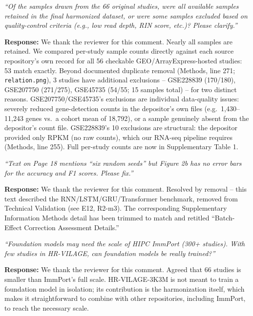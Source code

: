 \documentclass[11pt]{article}
\newcommand{\origcomment}[1]{\textit{``#1''}}
\newcommand{\filledresponse}[1]{%
  \par\medskip\noindent\textbf{Response:} #1\par
  \vspace{0.4cm}%
  \par\noindent\hrulefill\par\bigskip
}
\begin{document}
\begin{commentlist}
\item[R2-m6.] \origcomment{Of the samples drawn from the 66 original studies, were all available
samples retained in the final harmonized dataset, or were some samples excluded based on
quality-control criteria (e.g., low read depth, RIN score, etc.)? Please clarify.}
\filledresponse{We thank the reviewer for this comment. Nearly all samples are retained. We
compared per-study sample counts directly against each source repository's own record for all 56
checkable GEO/ArrayExpress-hosted studies: 53 match exactly. Beyond documented duplicate removal
(Methods, line 271; \texttt{relation.png}), 3 studies have additional exclusions -- GSE228839
(170/180), GSE207750 (271/275), GSE45735 (54/55; 15 samples total) -- for two distinct reasons.
GSE207750/GSE45735's exclusions are individual data-quality issues: severely reduced gene-detection
counts in the depositor's own files (e.g.\ 1{,}430--11{,}243 genes vs.\ a cohort mean of 18{,}792),
or a sample genuinely absent from the depositor's count file. GSE228839's 10 exclusions are
structural: the depositor provided only RPKM (no raw counts), which our RNA-seq pipeline requires
(Methods, line 255). Full per-study counts are now in Supplementary Table 1.}

\item[R2-m7.] \origcomment{Text on Page 18 mentions ``six random seeds'' but Figure 2b has no
error bars for the accuracy and F1 scores. Please fix.}
\filledresponse{We thank the reviewer for this comment. Resolved by removal -- this text described
the RNN/LSTM/GRU/Transformer benchmark, removed from Technical Validation (see E12, R2-m3). The
corresponding Supplementary Information Methods detail has been trimmed to match and retitled
``Batch-Effect Correction Assessment Details.''}

\item[R2-m8.] \origcomment{Foundation models may need the scale of HIPC ImmPort (300+ studies).
With few studies in HR-VILAGE, can foundation models be really trained?}
\filledresponse{We thank the reviewer for this comment. Agreed that 66 studies is smaller than
ImmPort's full scale. HR-VILAGE-3K3M is not meant to train a foundation model in isolation; its
contribution is the harmonization itself, which makes it straightforward to combine with other
repositories, including ImmPort, to reach the necessary scale.}


\end{commentlist}
\end{document}

